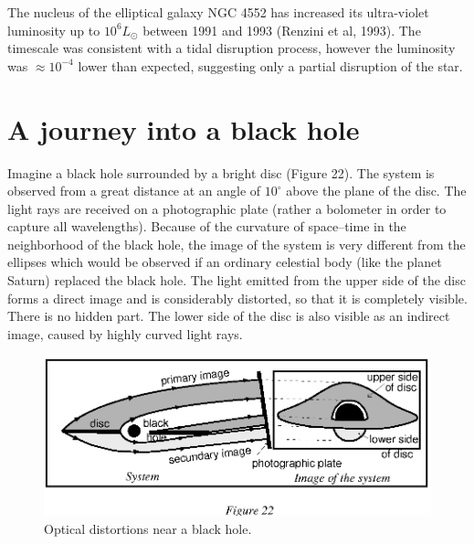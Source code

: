\documentclass{lamuphys}
\begin{document}
The nucleus of the elliptical galaxy NGC 
4552 has increased its ultra-violet luminosity up to $10^{6} 
L_{\odot}$ between 1991 and 1993 (Renzini et al, 1993). The timescale 
was consistent with a tidal disruption process, however the luminosity 
was $\approx 10^{-4}$ lower than expected, suggesting only a partial disruption 
of the star.

\section {A journey into a black hole}

Imagine a black hole surrounded by a bright disc (Figure 22). The 
system is observed  from a great distance at an angle of $10^{\circ}$ 
above the plane of the disc. The light rays are received on a 
photographic plate (rather a bolometer in order to capture all 
wavelengths). Because of the curvature of space--time in the 
neighborhood of the black hole, the image of the system is very 
different from the ellipses which would be observed if an ordinary 
celestial body (like the planet Saturn) replaced the black hole. The 
light emitted from the upper side of the disc forms a direct image and 
is considerably distorted, so that it is completely visible. There is 
no hidden part. The lower side of the disc is also visible as an 
indirect image, caused by highly curved light rays. 
\begin{figure}[tb]
  \begin{center}
    \leavevmode
        \includegraphics{image.ps}
        \caption{Optical distortions near a black hole.}
  \end{center}
\end{figure}
\end{document}

